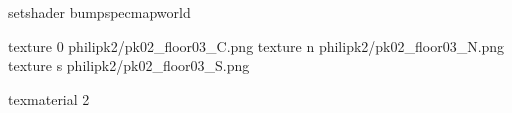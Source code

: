 setshader bumpspecmapworld

texture 0 philipk2/pk02_floor03_C.png
texture n philipk2/pk02_floor03_N.png
texture s philipk2/pk02_floor03_S.png

texmaterial 2
